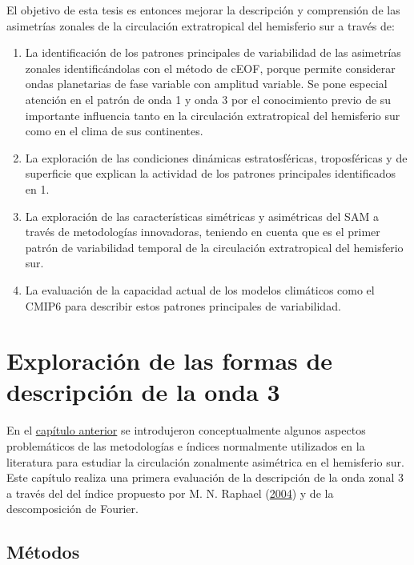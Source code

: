 \documentclass[12pt,oneside,a4paper]{reedthesis}
\begin{document}
El objetivo de esta tesis es entonces mejorar la descripción y comprensión de las asimetrías zonales de la circulación extratropical del hemisferio sur a través de:

\begin{enumerate}
\def\labelenumi{\arabic{enumi}.}
\item
  La identificación de los patrones principales de variabilidad de las asimetrías zonales identificándolas con el método de cEOF, porque permite considerar ondas planetarias de fase variable con amplitud variable.
  Se pone especial atención en el patrón de onda 1 y onda 3 por el conocimiento previo de su importante influencia tanto en la circulación extratropical del hemisferio sur como en el clima de sus continentes.
\item
  La exploración de las condiciones dinámicas estratosféricas, troposféricas y de superficie que explican la actividad de los patrones principales identificados en 1.
\item
  La exploración de las características simétricas y asimétricas del SAM a través de metodologías innovadoras, teniendo en cuenta que es el primer patrón de variabilidad temporal de la circulación extratropical del hemisferio sur.
\item
  La evaluación de la capacidad actual de los modelos climáticos como el CMIP6 para describir estos patrones principales de variabilidad.
\end{enumerate}

\hypertarget{onda3}{%
\chapter{Exploración de las formas de descripción de la onda 3}\label{onda3}}

En el \protect\hyperlink{intro}{capítulo anterior} se introdujeron conceptualmente algunos aspectos problemáticos de las metodologías e índices normalmente utilizados en la literatura para estudiar la circulación zonalmente asimétrica en el hemisferio sur.
Este capítulo realiza una primera evaluación de la descripción de la onda zonal 3 a través del del índice propuesto por M. N. Raphael (\protect\hyperlink{ref-raphael2004}{2004}) y de la descomposición de Fourier.

\hypertarget{muxe9todos}{%
\section{Métodos}\label{muxe9todos}}
\end{document}
